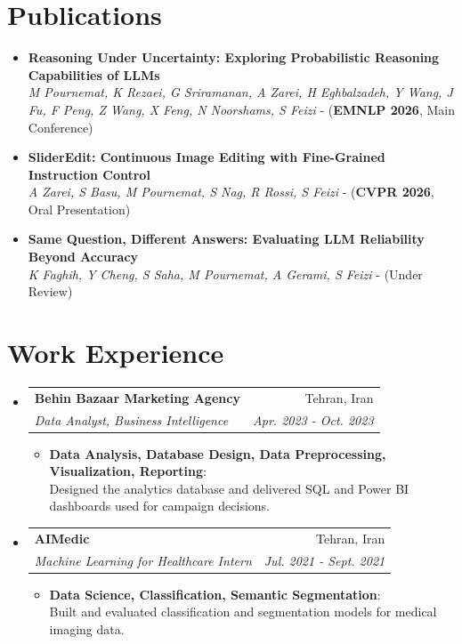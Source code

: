 \documentclass[letterpaper,10pt]{article}
\makeatletter
\newcommand{\cvHeading}[4]{%
  \item
  \begin{tabular*}{\linewidth}{@{}l@{\extracolsep{\fill}}r@{}}
    \textbf{#1} & #2 \\[1pt]
    \textit{\small #3} & \textit{\small #4}
  \end{tabular*}%
}
\newcommand{\cvDetail}[2]{\item \textbf{#1}:\\ #2}
\newenvironment{cvlist}
  {\begin{itemize}[leftmargin=0.16in,label=\textbullet,itemsep=5pt,parsep=0pt,topsep=4pt,partopsep=0pt]}
  {\end{itemize}}
\newenvironment{cvsublist}
  {\begin{itemize}[leftmargin=0.2in,label=$\circ$,itemsep=2pt,parsep=0pt,topsep=4pt,partopsep=0pt]\small}
  {\end{itemize}}
\makeatother
\begin{document}
\section{Publications}
\begin{cvlist}
  \item \textbf{Reasoning Under Uncertainty: Exploring Probabilistic Reasoning Capabilities of LLMs}\\
    {\small\textit{M Pournemat, K Rezaei, G Sriramanan, A Zarei, H Eghbalzadeh, Y Wang, J Fu, F Peng, Z Wang, X Feng, N Noorshams, S Feizi} - (\textbf{EMNLP 2026}, Main Conference)}
  \item \textbf{SliderEdit: Continuous Image Editing with Fine-Grained Instruction Control}\\
    {\small\textit{A Zarei, S Basu, M Pournemat, S Nag, R Rossi, S Feizi} - (\textbf{CVPR 2026}, Oral Presentation)}
  \item \textbf{Same Question, Different Answers: Evaluating LLM Reliability Beyond Accuracy}\\
    {\small\textit{K Faghih, Y Cheng, S Saha, M Pournemat, A Gerami, S Feizi} - (Under Review)}
\end{cvlist}

\section{Work Experience}
\begin{cvlist}
  \cvHeading
    {Behin Bazaar Marketing Agency}{Tehran, Iran}
    {Data Analyst, Business Intelligence}{Apr. 2023 - Oct. 2023}
  \begin{cvsublist}
    \cvDetail{Data Analysis, Database Design, Data Preprocessing, Visualization, Reporting}
      {Designed the analytics database and delivered SQL and Power BI dashboards used for campaign decisions.}
  \end{cvsublist}

  \cvHeading
    {AIMedic}{Tehran, Iran}
    {Machine Learning for Healthcare Intern}{Jul. 2021 - Sept. 2021}
  \begin{cvsublist}
    \cvDetail{Data Science, Classification, Semantic Segmentation}
      {Built and evaluated classification and segmentation models for medical imaging data.}
  \end{cvsublist}
\end{cvlist}
\end{document}
